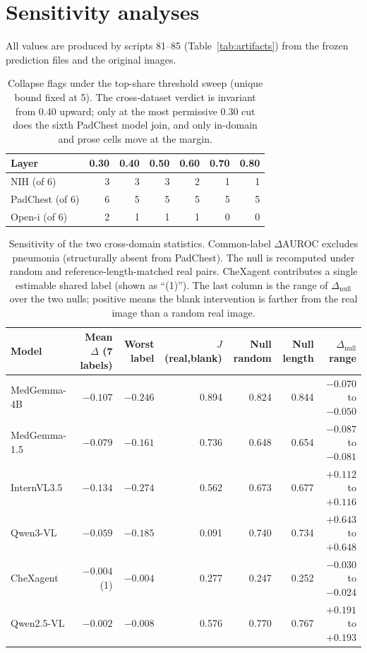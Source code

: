 \section{Sensitivity analyses}
\label{app:risk}

All values are produced by scripts 81--85 (Table~\ref{tab:artifacts}) from the frozen prediction files and the original images.

\begin{table}[H]
\centering
\small
\caption{Collapse flags under the top-share threshold sweep (unique bound fixed at 5). The cross-dataset verdict is invariant from 0.40 upward; only at the most permissive 0.30 cut does the sixth PadChest model join, and only in-domain and prose cells move at the margin.}
\label{tab:sweep}
\begin{tabular}{lrrrrrr}
\toprule
Layer & 0.30 & 0.40 & 0.50 & 0.60 & 0.70 & 0.80 \\
\midrule
NIH (of 6) & 3 & 3 & 3 & 2 & 1 & 1 \\
PadChest (of 6) & 6 & 5 & 5 & 5 & 5 & 5 \\
Open-i (of 6) & 2 & 1 & 1 & 1 & 0 & 0 \\
\bottomrule
\end{tabular}
\end{table}

\begin{table}[H]
\centering
\footnotesize
\setlength{\tabcolsep}{3pt}
\caption{Sensitivity of the two cross-domain statistics. Common-label $\Delta$AUROC excludes pneumonia (structurally absent from PadChest). The null is recomputed under random and reference-length-matched real pairs. CheXagent contributes a single estimable shared label (shown as ``(1)''). The last column is the range of $\Delta_{\text{null}}$ over the two nulls; positive means the blank intervention is farther from the real image than a random real image.}
\label{tab:sens}
\begin{tabular}{lrrrrrr}
\toprule
Model & Mean $\Delta$ (7 labels) & Worst label & $J$(real,blank) & Null random & Null length & $\Delta_{\text{null}}$ range \\
\midrule
MedGemma-4B & $-0.107$ & $-0.246$ & 0.894 & 0.824 & 0.844 & $-0.070$ to $-0.050$ \\
MedGemma-1.5 & $-0.079$ & $-0.161$ & 0.736 & 0.648 & 0.654 & $-0.087$ to $-0.081$ \\
InternVL3.5 & $-0.134$ & $-0.274$ & 0.562 & 0.673 & 0.677 & $+0.112$ to $+0.116$ \\
Qwen3-VL & $-0.059$ & $-0.185$ & 0.091 & 0.740 & 0.734 & $+0.643$ to $+0.648$ \\
CheXagent & $-0.004$ (1) & $-0.004$ & 0.277 & 0.247 & 0.252 & $-0.030$ to $-0.024$ \\
Qwen2.5-VL & $-0.002$ & $-0.008$ & 0.576 & 0.770 & 0.767 & $+0.191$ to $+0.193$ \\
\bottomrule
\end{tabular}
\end{table}

